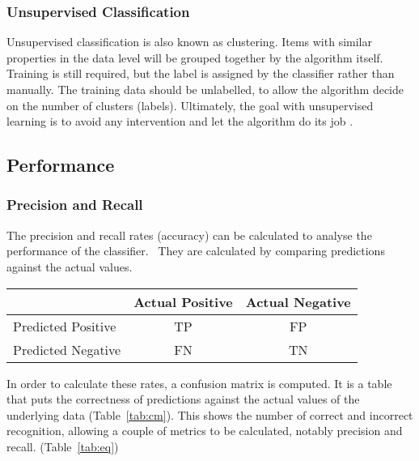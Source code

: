 \documentclass[lit_review.tex]{subfiles}
\begin{document}
\subsubsection{Unsupervised Classification} \label{sssec:unsupervised_overview}
Unsupervised classification is also known as clustering. Items with similar properties in the data level will be grouped together by the algorithm itself. Training is still required, but the label is assigned by the classifier rather than manually. The training data should be unlabelled, to allow the algorithm decide on the number of clusters (labels). Ultimately, the goal with unsupervised learning is to avoid any intervention and let the algorithm do its job \cite{hall-notes}. 


\subsection{Performance}
\subsubsection{Precision and Recall}
The precision and recall rates (accuracy) can be calculated to analyse the performance of the classifier.~\cite{precision-recall} They are calculated by comparing predictions against the actual values.

\parbox{\linewidth} {
  \centering
  \begin{tabular}{|l|c|c|}
    \hline
                        & Actual Positive & Actual Negative
    \\ \hline
    Predicted Positive  & TP              & FP
    \\ \hline
    Predicted Negative  & FN              & TN
    \\ \hline
  \end{tabular}

  \label{tab:cm}
}

In order to calculate these rates, a confusion matrix is computed. It is a table that puts the correctness of predictions against the actual values of the underlying data (Table~\ref{tab:cm}). This shows the number of correct and incorrect recognition, allowing a couple of metrics to be calculated, notably precision and recall. (Table~\ref{tab:eq}) 
\end{document}
